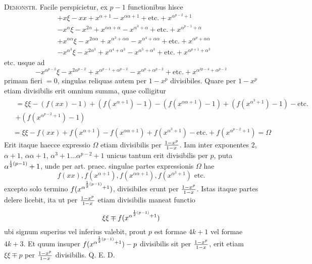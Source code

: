 \documentclass[twoside,12pt, showframe]{memoir}
\let\oldfrac\frac
\def\frac#1#2{\mathchoice{\tfrac{#1}{#2}}{\oldfrac{#1}{#2}}{\genfrac{}{}{}{2}{#1}{#2\mathstrut}}{\genfrac{}{}{}{3}{#1}{#2\mathstrut}}}
\begin{document}
\textsc{Demonstr.} Facile perspicietur, ex \(p-1\) functionibus hisce
\[\begin{aligned}
& +x \xi-x x+x^{\alpha+1}-x^{\alpha \alpha+1}+\text{etc.}+x^{\alpha^{p-2}+1} \\
& -x^{\alpha} \xi-x^{2 \alpha}+x^{\alpha \alpha+\alpha}-x^{\alpha^{3}+\alpha}+\text{etc.}+x^{\alpha^{p-1}+\alpha} \\
& +x^{\alpha \alpha} \xi-x^{2 \alpha \alpha}+x^{\alpha^{3}+\alpha \alpha}-x^{\alpha^{4}+\alpha \alpha}+\text{etc.}+x^{\alpha^{p}+\alpha \alpha} \\
& -x^{\alpha^{3}} \xi-x^{2 \alpha^{3}}+x^{\alpha^{4}+\alpha^{3}}-x^{\alpha^{5}+\alpha^{3}}+\text{etc.}+x^{\alpha^{p+1}+\alpha^{3}}
\end{aligned}\]
etc. usque ad
\[-x^{\alpha^{p-2}} \xi-x^{2 \alpha^{p-2}}+x^{\alpha^{p-1}+\alpha^{p-2}}-x^{\alpha^{p}+\alpha^{p-2}}+\text{etc.}+x^{\alpha^{2 p-4}+\alpha^{p-2}}\]
primam fieri \(=0\), singulas reliquas autem per \(1-x^{p}\) divisibiles. Quare per \(1-x^{p}\) etiam divisibilis erit omnium summa, quae colligitur
\[\begin{aligned}
&\begin{gathered}=\xi \xi-(f(x x)-1)+(f(x^{\alpha+1})-1)-(f(x^{\alpha \alpha+1})-1)+(f(x^{\alpha^{3}+1})-1)-\text{etc.}\\
+(f(x^{\alpha^{p-2}+1})-1) \end{gathered}\\
&=\xi \xi-f(x x)+f(x^{\alpha+1})-f(x^{\alpha \alpha+1})+f(x^{\alpha^{3}+1})-\text{etc.}+f(x^{\alpha^{p-2}+1})=\Omega
\end{aligned}\]
Erit itaque haecce expressio \(\Omega\) etiam divisibilis per \(\frac{1-x^{p}}{1-x}\). Iam inter exponentes \(2\), \(\alpha+1\), \(\alpha \alpha+1\), \(\alpha^{3}+1 \ldots \alpha^{p-2}+1\) unicus tantum erit divisibilis per \(p\), puta \(\alpha^{\frac{1}{2}(p-1)}+1\), unde per art. praec. singulae partes expressionis \(\Omega\) hae
\[f(x x), f(x^{\alpha+1}), f(x^{\alpha \alpha+1}), f(x^{\alpha^{3}+1}) \text{ etc.}\]
excepto solo termino \(f(x^{\alpha^{\frac{1}{2}(p-1)}+1})\), divisibiles erunt per \(\frac{1-x^{p}}{1-x}\). Istas itaque partes delere licebit, ita ut per \(\frac{1-x^{p}}{1-x}\) etiam divisibilis maneat functio
\[\xi \xi \mp f(x^{\alpha^{\frac{1}{2}(p-1)}+1})\]\clearpage\noindent%
ubi signum superius vel inferius valebit, prout \(p\) est formae \(4 k+1\) vel formae \(4 k+3\). Et quum insuper \(f(x^{\alpha^{\frac{1}{2}(p-1)}+1})-p\) divisibilis sit per \(\frac{1-x^{p}}{1-x}\), erit etiam \(\xi \xi \mp p\) per \(\frac{1-x^{p}}{1-x}\) divisibilis. Q. E. D.
 
\end{document}
